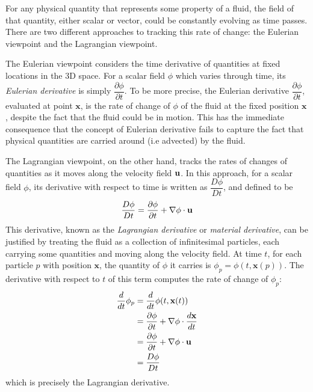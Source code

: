 For any physical quantity that represents some property of a fluid, the field of that quantity, either scalar or vector, could be constantly evolving as time passes. There are two different approaches to tracking this rate of change: the Eulerian viewpoint and the Lagrangian viewpoint.

The Eulerian viewpoint considers the time derivative of quantities at fixed locations in the 3D space. For a scalar field $\phi$ which varies through time, its \textit{Eulerian derivative} is simply $\dfrac{\partial \phi}{\partial t}$. To be more precise, the Eulerian derivative $\dfrac{\partial \phi}{\partial t}$, evaluated at point $\textbf{x}$, is the rate of change of $\phi$ of the fluid at the fixed position $\textbf{x}$, despite the fact that the fluid could be in motion. This has the immediate consequence that the concept of Eulerian derivative fails to capture the fact that physical quantities are carried around (i.e advected) by the fluid. 

The Lagrangian viewpoint, on the other hand, tracks the rates of changes of quantities as it moves along the velocity field $\textbf{u}$. In this approach, for a scalar field $\phi$, its derivative with respect to time is written as $\dfrac{D\phi}{Dt}$, and defined to be
$$
\frac{D\phi}{Dt} = \frac{\partial\phi}{\partial t} + \nabla \phi \cdot \textbf{u}
$$ 
This derivative, known as the \textit{Lagrangian derivative} or \textit{material derivative}, can be justified by treating the fluid as a collection of infinitesimal particles, each carrying some quantities and moving along the velocity field. At time $t$, for each particle $p$ with position $\textbf{x}$, the quantity of $\phi$ it carries is $\phi_p = \phi(t,\textbf{x}(p))$. The derivative with respect to $t$ of this term computes the rate of change of $\phi _p$:
$$
\begin{aligned}
    \frac{d}{dt} \phi_p
        &= \frac{d}{dt} \phi(t,\textbf{x}(t)) \\
        &= \frac{\partial \phi}{\partial t} + \nabla \phi \cdot \frac{d\textbf{x}}{dt} \\ 
        &= \frac{\partial \phi}{\partial t} + \nabla \phi \cdot \textbf{u} \\
        &=\frac{D\phi}{Dt}
\end{aligned}
$$
which is precisely the Lagrangian derivative.

